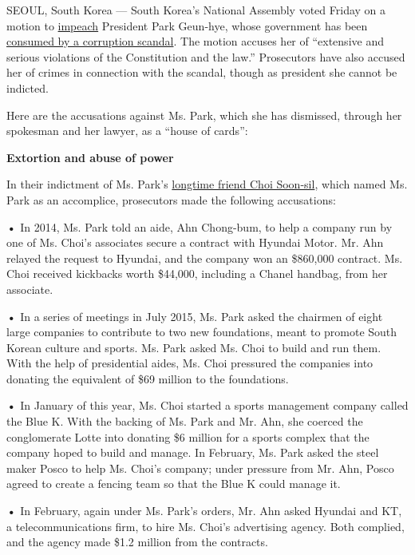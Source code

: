 SEOUL, South Korea --- South Korea's National Assembly voted Friday on a
motion to
\href{http://www.nytimes.com/2016/12/09/world/asia/south-korea-president-park-geun-hye-impeached.html}{impeach}
President Park Geun-hye, whose government has been
\href{http://www.nytimes.com/2016/12/06/world/asia/park-geun-hye-south-korea-april.html}{consumed
by a corruption scandal}. The motion accuses her of ``extensive and
serious violations of the Constitution and the law.'' Prosecutors have
also accused her of crimes in connection with the scandal, though as
president she cannot be indicted.

Here are the accusations against Ms. Park, which she has dismissed,
through her spokesman and her lawyer, as a ``house of cards'':

\textbf{Extortion and abuse of power}

In their indictment of Ms. Park's
\href{https://www.nytimes.com/2016/11/01/world/asia/south-korea-park-geun-hye-choi-soon-sil.html}{longtime
friend Choi Soon-sil}, which named Ms. Park as an accomplice,
prosecutors made the following accusations:

\textbf{•} In 2014, Ms. Park told an aide, Ahn Chong-bum, to help a
company run by one of Ms. Choi's associates secure a contract with
Hyundai Motor. Mr. Ahn relayed the request to Hyundai, and the company
won an \$860,000 contract. Ms. Choi received kickbacks worth \$44,000,
including a Chanel handbag, from her associate.

\textbf{•} In a series of meetings in July 2015, Ms. Park asked the
chairmen of eight large companies to contribute to two new foundations,
meant to promote South Korean culture and sports. Ms. Park asked Ms.
Choi to build and run them. With the help of presidential aides, Ms.
Choi pressured the companies into donating the equivalent of \$69
million to the foundations.

\textbf{•} In January of this year, Ms. Choi started a sports management
company called the Blue K. With the backing of Ms. Park and Mr. Ahn, she
coerced the conglomerate Lotte into donating \$6 million for a sports
complex that the company hoped to build and manage. In February, Ms.
Park asked the steel maker Posco to help Ms. Choi's company; under
pressure from Mr. Ahn, Posco agreed to create a fencing team so that the
Blue K could manage it.

\textbf{•} In February, again under Ms. Park's orders, Mr. Ahn asked
Hyundai and KT, a telecommunications firm, to hire Ms. Choi's
advertising agency. Both complied, and the agency made \$1.2 million
from the contracts.

